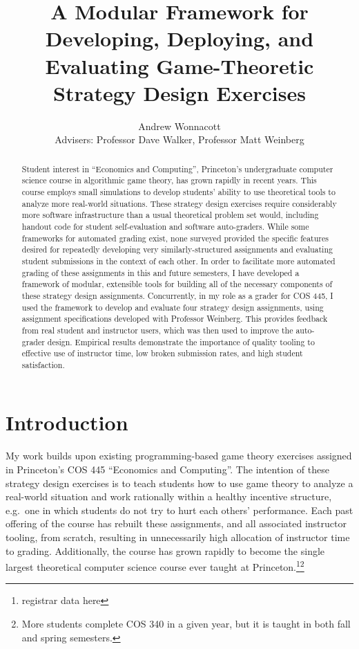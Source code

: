 \documentclass[pageno]{jpaper}
\begin{document}
\title{
A Modular Framework for Developing, Deploying, and Evaluating Game-Theoretic Strategy Design Exercises}

\author{Andrew Wonnacott\\
  Advisers: Professor Dave Walker, Professor Matt Weinberg}

\date{}
\maketitle

\thispagestyle{empty}
\doublespacing{}
\begin{abstract}
  Student interest in ``Economics and Computing'', Princeton's undergraduate computer science course in algorithmic game theory, has grown rapidly in recent years.
  This course employs small simulations to develop students' ability to use theoretical tools to analyze more real-world situations.
  These strategy design exercises require considerably more software infrastructure than a usual theoretical problem set would, including handout code for student self-evaluation and software auto-graders.
  While some frameworks for automated grading exist, none surveyed provided the specific features desired for repeatedly developing very similarly-structured assignments and evaluating student submissions in the context of each other.
  In order to facilitate more automated grading of these assignments in this and future semesters, I have developed a framework of modular, extensible tools for building all of the necessary components of these strategy design assignments.
  Concurrently, in my role as a grader for COS 445, I used the framework to develop and evaluate four strategy design assignments, using assignment specifications developed with Professor Weinberg.
  This provides feedback from real student and instructor users, which was then used to improve the auto-grader design.
  Empirical results demonstrate the importance of quality tooling to effective use of instructor time, low broken submission rates, and high student satisfaction.
\end{abstract}

\newpage
\section*{Introduction}
My work builds upon existing programming-based game theory exercises assigned in Princeton's COS 445 ``Economics and Computing''.
The intention of these strategy design exercises is to teach students how to use game theory to analyze a real-world situation and work rationally within a healthy incentive structure, e.g.\ one in which students do not try to hurt each others’ performance.
Each past offering of the course has rebuilt these assignments, and all associated instructor tooling, from scratch, resulting in unnecessarily high allocation of instructor time to grading.
Additionally, the course has grown rapidly to become the single largest theoretical computer science course ever taught at Princeton.\footnote{registrar data here}\footnote{More students complete COS 340 in a given year, but it is taught in both fall and spring semesters.}
\end{document}

